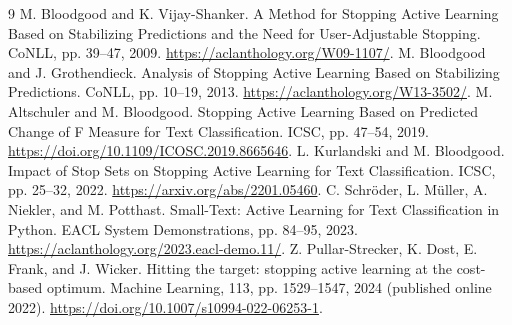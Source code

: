 \documentclass[10pt,twocolumn]{article}
\begin{document}
\begin{thebibliography}{9}
 M. Bloodgood and K. Vijay-Shanker. A Method for Stopping Active Learning Based on Stabilizing Predictions and the Need for User-Adjustable Stopping. CoNLL, pp. 39--47, 2009. \url{https://aclanthology.org/W09-1107/}.
 M. Bloodgood and J. Grothendieck. Analysis of Stopping Active Learning Based on Stabilizing Predictions. CoNLL, pp. 10--19, 2013. \url{https://aclanthology.org/W13-3502/}.
 M. Altschuler and M. Bloodgood. Stopping Active Learning Based on Predicted Change of F Measure for Text Classification. ICSC, pp. 47--54, 2019. \url{https://doi.org/10.1109/ICOSC.2019.8665646}.
 L. Kurlandski and M. Bloodgood. Impact of Stop Sets on Stopping Active Learning for Text Classification. ICSC, pp. 25--32, 2022. \url{https://arxiv.org/abs/2201.05460}.
 C. Schr\"oder, L. M\"uller, A. Niekler, and M. Potthast. Small-Text: Active Learning for Text Classification in Python. EACL System Demonstrations, pp. 84--95, 2023. \url{https://aclanthology.org/2023.eacl-demo.11/}.
 Z. Pullar-Strecker, K. Dost, E. Frank, and J. Wicker. Hitting the target: stopping active learning at the cost-based optimum. Machine Learning, 113, pp. 1529--1547, 2024 (published online 2022). \url{https://doi.org/10.1007/s10994-022-06253-1}.
\end{thebibliography}
\end{document}
